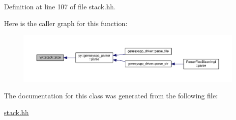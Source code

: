 Definition at line 107 of file stack.\-hh.



Here is the caller graph for this function\-:
\nopagebreak
\begin{figure}[H]
\begin{center}
\leavevmode
\includegraphics[width=350pt]{classyy_1_1stack_a5894306917b11057b00e44fbb760839e_icgraph}
\end{center}
\end{figure}




The documentation for this class was generated from the following file\-:\begin{DoxyCompactItemize}
\item 
\hyperlink{stack_8hh}{stack.\-hh}\end{DoxyCompactItemize}
